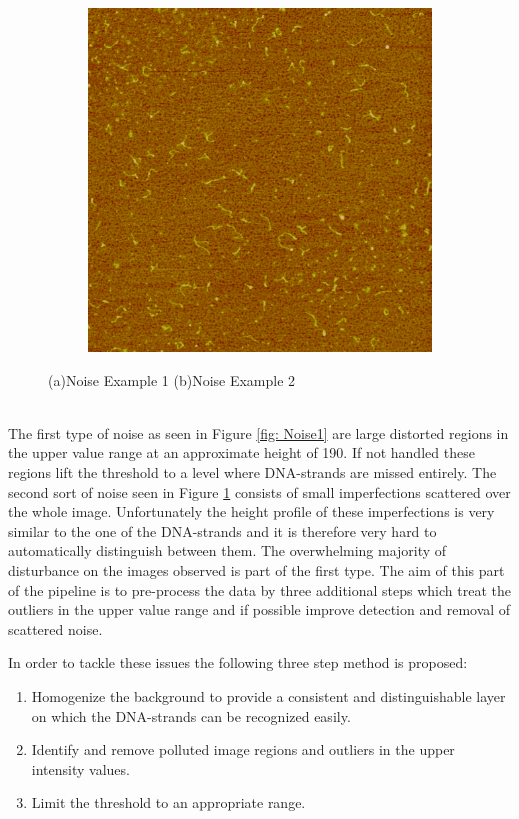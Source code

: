 \begin{figure}[!htb]
\begin{subfigure}{0.5\textwidth}
		\includegraphics[width=\linewidth]{noise2.png}
		\caption{}
		\label{fig: Noise2}
	\end{subfigure}%
	\caption{(a)Noise Example 1 (b)Noise Example 2}\label{fig:Noise1Noise2}
\end{figure}
\\
The first type of noise as seen in Figure \ref{fig: Noise1} are large distorted regions in the upper value range at an approximate height of 190. If not handled these regions lift the threshold to a level where DNA-strands are missed entirely. 
The second sort of noise seen in Figure \ref{fig: Noise2} consists of small imperfections scattered over the whole image.
Unfortunately the height profile of these imperfections is very similar to the one of the DNA-strands and it is therefore very hard to automatically distinguish between them.
The overwhelming majority of disturbance on the images observed is part of the first type.
The aim of this part of the pipeline is to pre-process the data by three additional steps which treat the outliers in the upper value range and if possible improve detection and removal of scattered noise.

In order to tackle these issues the following three step method is proposed:
\begin{enumerate}
	\item Homogenize the background to provide a consistent and distinguishable layer on which the DNA-strands can be recognized easily.
	\item Identify and remove polluted image regions and outliers in the upper intensity values.
	\item Limit the threshold to an appropriate range.
\end{enumerate}
